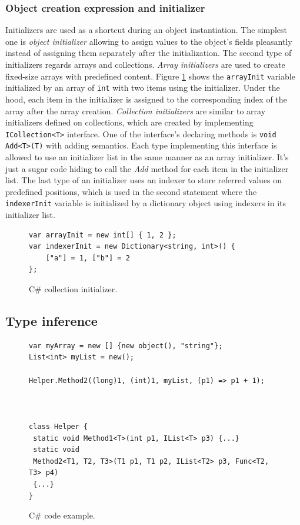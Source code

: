\subsubsection*{Object creation expression and initializer}
Initializers are used as a shortcut during an object instantiation.
The simplest one is \textit{object initializer} allowing to assign values to the object's fields pleasantly instead of assigning them separately after the initialization.
The second type of initializers regards arrays and collections.
\textit{Array initializers} are used to create fixed-size arrays with predefined content.
Figure \ref{img07:initializer} shows the \texttt{arrayInit} variable initialized by an array of \texttt{int} with two items using the initializer.
Under the hood, each item in the initializer is assigned to the corresponding index of the array after the array creation.
\textit{Collection initializers} are similar to array initializers defined on collections, which are created by implementing \texttt{ICollection<T>} interface.
One of the interface's declaring methods is \texttt{void Add<T>(T)} with adding semantics.
Each type implementing this interface is allowed to use an initializer list in the same manner as an array initializer.
It's just a sugar code hiding to call the \textit{Add} method for each item in the initializer list.
The last type of an initializer uses an indexer to store referred values on predefined positions, which is used in the second statement where the \texttt{indexerInit} variable is initialized by a dictionary object using indexers in its initializer list.
\begin{figure}[h]
\begin{lstlisting}[style=csharp]
var arrayInit = new int[] { 1, 2 };
var indexerInit = new Dictionary<string, int>() { 
    ["a"] = 1, ["b"] = 2 
};
\end{lstlisting}
\caption{C\# collection initializer.}
\label{img07:initializer}
\end{figure}

\subsection{Type inference} \label{sect02:typeInference}


\begin{figure}
\begin{lstlisting}[style=csharpN]
var myArray = new [] {new object(), "string"};
List<int> myList = new();

Helper.Method2((long)1, (int)1, myList, (p1) => p1 + 1);



class Helper {
 static void Method1<T>(int p1, IList<T> p3) {...}
 static void
 Method2<T1, T2, T3>(T1 p1, T1 p2, IList<T2> p3, Func<T2, T3> p4)
 {...}
}
\end{lstlisting}
\caption{C\# code example.}
\label{img55:typeConst}
\end{figure}


